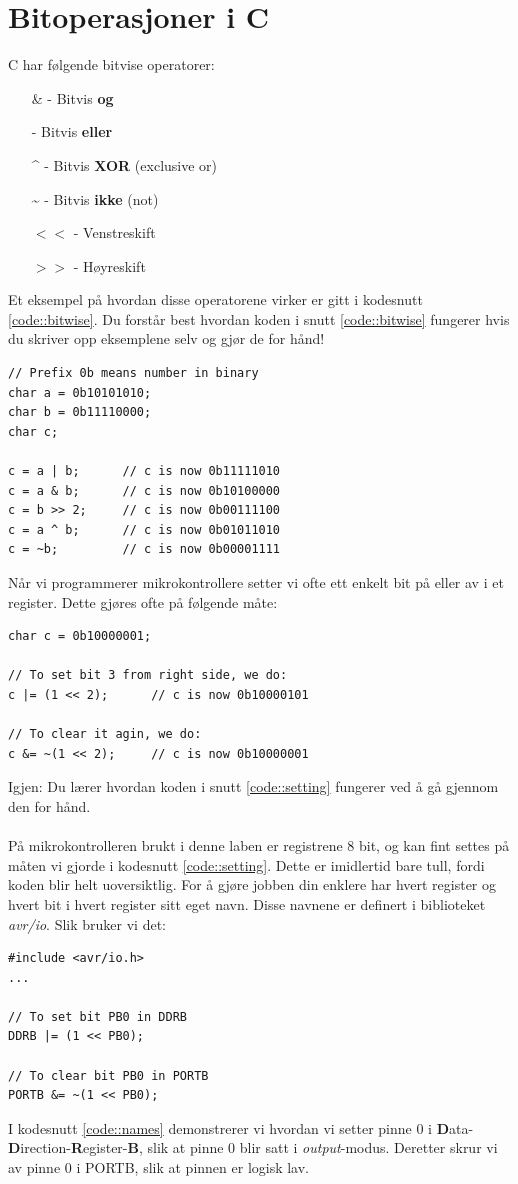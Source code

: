 \documentclass[11pt,a4paper]{article}
\begin{document}
\newpage
\noindent
\appendix
\section{Bitoperasjoner i C}
\label{Bitwise::in::C}
C har følgende bitvise operatorer:
\begin{itemize}
\item[\&] - Bitvis \textbf{og}
\item[\textbar] - Bitvis \textbf{eller}
\item[\textasciicircum] - Bitvis \textbf{XOR} (exclusive or)
\item[\textasciitilde] - Bitvis \textbf{ikke} (not)
\item[$<<$] - Venstreskift
\item[$>>$] - Høyreskift
\end{itemize}
Et eksempel på hvordan disse operatorene virker er gitt i kodesnutt \ref{code::bitwise}. Du forstår best hvordan koden i snutt \ref{code::bitwise} fungerer hvis du skriver opp eksemplene selv og gjør de for hånd!
\begin{lstlisting}[caption=Bitvise operatorer i C.,label=code::bitwise]
// Prefix 0b means number in binary
char a = 0b10101010;
char b = 0b11110000;
char c;

c = a | b;		// c is now 0b11111010
c = a & b;		// c is now 0b10100000
c = b >> 2;		// c is now 0b00111100
c = a ^ b;		// c is now 0b01011010
c = ~b;			// c is now 0b00001111
\end{lstlisting}
Når vi programmerer mikrokontrollere setter vi ofte ett enkelt bit på eller av i et register. Dette gjøres ofte på følgende måte:
\begin{lstlisting}[caption=Setting av enkelte bit.,label=code::setting]
char c = 0b10000001;

// To set bit 3 from right side, we do:
c |= (1 << 2);		// c is now 0b10000101

// To clear it agin, we do:
c &= ~(1 << 2);		// c is now 0b10000001
\end{lstlisting}
Igjen: Du lærer hvordan koden i snutt \ref{code::setting} fungerer ved å gå gjennom den for hånd.\\
\\
På mikrokontrolleren brukt i denne laben er registrene 8 bit, og kan fint settes på måten vi gjorde i kodesnutt \ref{code::setting}. Dette er imidlertid bare tull, fordi koden blir helt uoversiktlig. For å gjøre jobben din enklere har hvert register og hvert bit i hvert register sitt eget navn. Disse navnene er definert i biblioteket \textit{avr/io}. Slik bruker vi det:
\begin{lstlisting}[caption=Bruk av registernavn.,label=code::names]
#include <avr/io.h>
...

// To set bit PB0 in DDRB
DDRB |= (1 << PB0);

// To clear bit PB0 in PORTB
PORTB &= ~(1 << PB0);
\end{lstlisting}
I kodesnutt \ref{code::names} demonstrerer vi hvordan vi setter pinne 0 i \textbf{D}ata-\textbf{D}irection-\textbf{R}egister-\textbf{B}, slik at pinne 0 blir satt i \textit{output}-modus. Deretter skrur vi av pinne 0 i PORTB, slik at pinnen er logisk lav.
\end{document}
